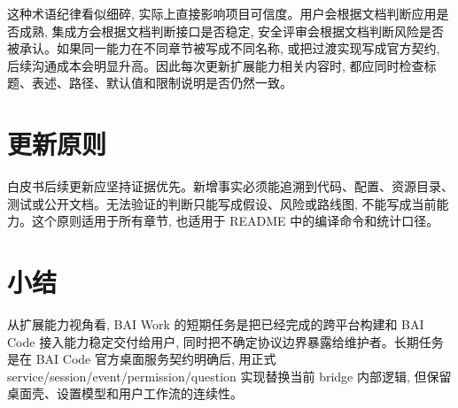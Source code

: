 这种术语纪律看似细碎, 实际上直接影响项目可信度。用户会根据文档判断应用是否成熟, 集成方会根据文档判断接口是否稳定, 安全评审会根据文档判断风险是否被承认。如果同一能力在不同章节被写成不同名称, 或把过渡实现写成官方契约, 后续沟通成本会明显升高。因此每次更新扩展能力相关内容时, 都应同时检查标题、表述、路径、默认值和限制说明是否仍然一致。

\section{更新原则}
白皮书后续更新应坚持证据优先。新增事实必须能追溯到代码、配置、资源目录、测试或公开文档。无法验证的判断只能写成假设、风险或路线图, 不能写成当前能力。这个原则适用于所有章节, 也适用于 README 中的编译命令和统计口径。

\section{小结}
从扩展能力视角看, BAI Work 的短期任务是把已经完成的跨平台构建和 BAI Code 接入能力稳定交付给用户, 同时把不确定协议边界暴露给维护者。长期任务是在 BAI Code 官方桌面服务契约明确后, 用正式 service/session/event/permission/question 实现替换当前 bridge 内部逻辑, 但保留桌面壳、设置模型和用户工作流的连续性。
